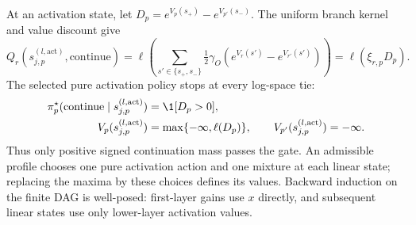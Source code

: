 \begin{definition}
At an activation state, let $D_p=e^{V_p(s_+)}-e^{V_{p'}(s_-)}$. The uniform branch kernel and value discount give
\begin{equation}\label{ptnb:eq:routing-activation-continue}
 Q_r(s_{j,p}^{(l,\mathrm{act})},\mathrm{continue})
 =\ell\!\left(\sum_{s'\in\{s_+,s_-\}}\tfrac12\gamma_O
       (e^{V_r(s')}-e^{V_{r'}(s')})\right)=\ell(\xi_{r,p}D_p).
\end{equation}
The selected pure activation policy stops at every log-space tie:
\begin{align}\label{ptnb:eq:routing-activation-value}
 \pi_p^\star(\mathrm{continue}\mid s_{j,p}^{(l,\mathrm{act})})&=\1[D_p>0],\nonumber\\
 V_p(s_{j,p}^{(l,\mathrm{act})})&=\max\{-\infty,\ell(D_p)\},
 \qquad V_{p'}(s_{j,p}^{(l,\mathrm{act})})=-\infty.
\end{align}
Thus only positive signed continuation mass passes the gate. An admissible profile chooses one pure activation action and one mixture at each linear state; replacing the maxima by these choices defines its values. Backward induction on the finite DAG is well-posed: first-layer gains use $x$ directly, and subsequent linear states use only lower-layer activation values.
\end{definition}

